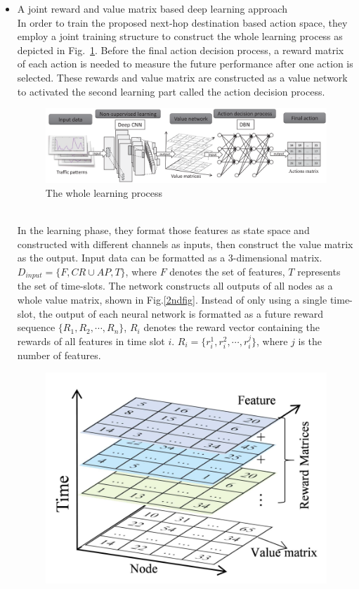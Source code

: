 \documentclass[11pt]{report}
\begin{document}
	\begin{itemize}
		\item A joint reward and value matrix based deep learning approach\\
		In order to train the proposed next-hop destination based action space, they employ a joint training structure to construct the whole learning process as depicted in Fig.~\ref{1stfig}. Before the final action decision process, a reward matrix of each action is needed to measure the future performance after one action is selected. These rewards and value matrix are constructed as a value network to activated the second learning part called the action decision process. 
		\begin{figure}[h!]
			\centering
			\includegraphics[width=\linewidth]{wholeprocess.png}
			\caption{The whole learning process}
			\label{1stfig}
		\end{figure}\\
	    In the learning phase, they format those features as state space and constructed with different channels as inputs, then construct the value matrix as the output. Input data can be formatted as a 3-dimensional matrix. $D_{input}=\{F,CR\cup AP,T\}$, where $F$ denotes the set of features, $T$ represents the set of time-slots. The network constructs all outputs of all nodes as a whole value matrix, shown in Fig.\ref{2ndfig}. Instead of only using a single time-slot, the output of each neural network is formatted as a future reward sequence $\{R_1,R_2,\cdots, R_n\}$, $R_i$ denotes the reward vector containing the rewards of all features in time slot $i$. $R_i = \{r^1_i,r^2_i,\cdots, r^j_i\}$, where $j$ is the number of features. 
	    \begin{figure}[h!]
	    	\centering
	    	\includegraphics[width=0.7\linewidth]{matrix.png}

\end{figure}
\end{itemize}
\end{document}

